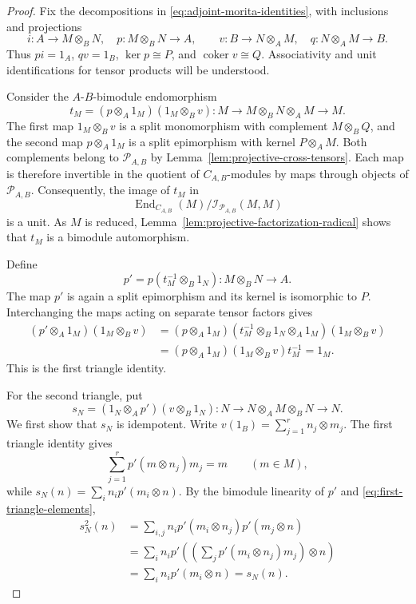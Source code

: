 \documentclass[12pt,a4paper,english,reqno]{amsart}
\numberwithin{equation}{section}
\theoremstyle{plain}
\theoremstyle{definition}
\begin{document}
\begin{proof}
Fix the decompositions in \eqref{eq:adjoint-morita-identities},
with inclusions and projections
\[
 i:A\longrightarrow M\otimes_BN,
 \quad p:M\otimes_BN\longrightarrow A,
 \qquad
 v:B\longrightarrow N\otimes_AM,
 \quad q:N\otimes_AM\longrightarrow B.
\]
Thus $pi=1_A$, $qv=1_B$, $\ker p\cong P$, and
$\operatorname{coker}v\cong Q$.  Associativity and unit
identifications for tensor products will be understood.

Consider the $A$-$B$-bimodule endomorphism
\[
 t_M=(p\otimes_A1_M)(1_M\otimes_Bv):
 M\longrightarrow M\otimes_BN\otimes_AM\longrightarrow M.
\]
The first map $1_M\otimes_Bv$ is a split monomorphism with
complement $M\otimes_BQ$, and the second map
$p\otimes_A1_M$ is a split epimorphism with kernel
$P\otimes_AM$.  Both complements belong to $\mathcal P_{A,B}$
by Lemma~\ref{lem:projective-cross-tensors}.  Each map is therefore
invertible in the quotient of $C_{A,B}$-modules by maps through
objects of $\mathcal P_{A,B}$.  Consequently, the image of $t_M$ in
\[
 \operatorname{End}_{C_{A,B}}(M)/\mathcal I_{\mathcal P_{A,B}}(M,M)
\]
is a unit.  As $M$ is reduced,
Lemma~\ref{lem:projective-factorization-radical} shows that $t_M$
is a bimodule automorphism.

Define
\begin{equation}
\label{eq:normalized-counit}
 p'=p(t_M^{-1}\otimes_B1_N):M\otimes_BN\longrightarrow A.
\end{equation}
The map $p'$ is again a split epimorphism and its kernel is
isomorphic to $P$.  Interchanging the maps acting on separate tensor
factors gives
\begin{align*}
 (p'\otimes_A1_M)(1_M\otimes_Bv)
 &=(p\otimes_A1_M)
   (t_M^{-1}\otimes_B1_N\otimes_A1_M)(1_M\otimes_Bv)\\
 &=(p\otimes_A1_M)(1_M\otimes_Bv)t_M^{-1}
   =1_M.
\end{align*}
This is the first triangle identity.

For the second triangle, put
\[
 s_N=(1_N\otimes_Ap')(v\otimes_B1_N):
 N\longrightarrow N\otimes_AM\otimes_BN\longrightarrow N.
\]
We first show that $s_N$ is idempotent.  Write
$v(1_B)=\sum_{j=1}^r n_j\otimes m_j$.  The first triangle identity gives
\begin{equation}
\label{eq:first-triangle-elements}
 \sum_{j=1}^r p'(m\otimes n_j)m_j=m
 \qquad(m\in M),
\end{equation}
while
$s_N(n)=\sum_i n_i p'(m_i\otimes n)$.  By the bimodule linearity
of $p'$ and \eqref{eq:first-triangle-elements},
\begin{align*}
 s_N^2(n)
 &=\sum_{i,j} n_i p'(m_i\otimes n_j)p'(m_j\otimes n)\\
 &=\sum_i n_i p'\left(
       \left(\sum_j p'(m_i\otimes n_j)m_j\right)\otimes n
       \right)\\
 &=\sum_i n_i p'(m_i\otimes n)=s_N(n).
\end{align*}


\end{proof}
\end{document}
